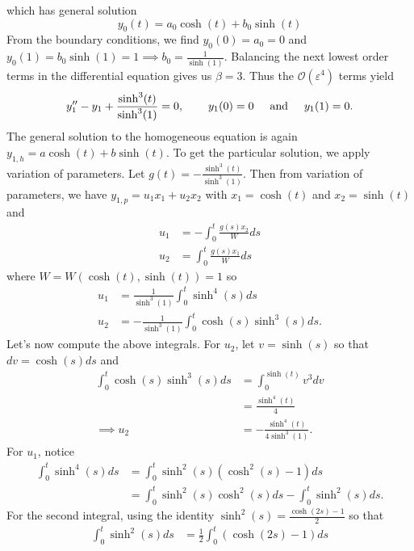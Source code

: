 \documentclass{article}
\begin{document}
\begin{itemize}
\begin{itemize}
        which has general solution
        \[y_0(t) = a_0\cosh(t) + b_0\sinh(t)\]
        From the boundary conditions, we find $y_0(0) = a_0 = 0$ and $y_0(1) = b_0\sinh(1) = 1 \implies b_0 = \frac{1}{\sinh(1)}$. Balancing the next lowest order terms in the differential equation gives us $\beta = 3$. Thus the $\mathcal{O}(\varepsilon^4)$ terms yield
        \[y_1'' - y_1 + \frac{\sinh^3(t)}{\sinh^3(1)} = 0, \hspace{0.75cm} y_1(0) = 0 \hspace{0.5cm} \text{and} \hspace{0.5cm} y_1(1) = 0.\]
        The general solution to the homogeneous equation is again $y_{1,h} = a\cosh(t) + b\sinh(t)$. To get the particular solution, we apply variation of parameters. Let $g(t) = -\frac{\sinh^3(t)}{\sinh^3(1)}$. Then from variation of parameters, we have $y_{1,p} = u_1x_1 + u_2x_2$ with $x_1 = \cosh(t)$ and $x_2 = \sinh(t)$ and
        \begin{align*}
            u_1 &= -\int_0^t\frac{g(s)x_2}{W}ds\\
            u_2 &= \int_0^t\frac{g(s)x_1}{W}ds
        \end{align*}
        where $W = W(\cosh(t), \sinh(t)) = 1$ so 
        \begin{align*}
            u_1 &= \frac{1}{\sinh^3(1)}\int_0^{t}\sinh^4(s)ds\\
            u_2 &= -\frac{1}{\sinh^3(1)}\int_0^t\cosh(s)\sinh^3(s)ds.
        \end{align*}
        Let's now compute the above integrals. For $u_2$, let $v = \sinh(s)$ so that $dv = \cosh(s)ds$ and
        \begin{align*}
            \int_0^t\cosh(s)\sinh^3(s)ds &= \int_0^{\sinh(t)}v^3dv\\
            &= \frac{\sinh^4(t)}{4}\\
            \implies u_2 &= -\frac{\sinh^4(t)}{4\sinh^3(1)}.
        \end{align*}
        For $u_1$, notice
        \begin{align*}
            \int_0^t\sinh^4(s)ds &= \int_0^t\sinh^2(s)(\cosh^2(s) - 1)ds\\
            &= \int_0^t\sinh^2(s)\cosh^2(s)ds - \int_0^t\sinh^2(s)ds.
        \end{align*}
        For the second integral, using the identity $\sinh^2(s) = \frac{\cosh(2s) - 1}{2}$ so that
        \begin{align*}
            \int_0^t\sinh^2(s)ds &= \frac{1}{2}\int_0^t(\cosh(2s) - 1)ds\\

\end{align*}
\end{itemize}
\end{itemize}
\end{document}
